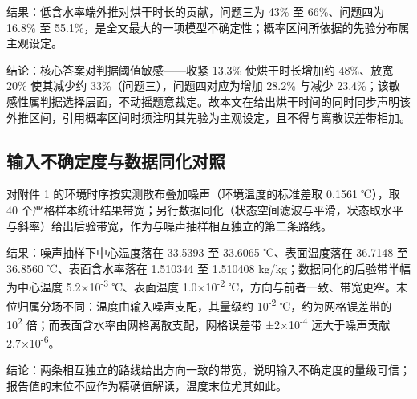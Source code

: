 结果：低含水率端外推对烘干时长的贡献，问题三为 43\% 至 66\%、问题四为 16.8\% 至 55.1\%，是全文最大的一项模型不确定性；概率区间所依据的先验分布属主观设定。

结论：核心答案对判据阈值敏感——收紧 13.3\% 使烘干时长增加约 48\%、放宽 20\% 使其减少约 33\%（问题三），问题四对应为增加 28.2\% 与减少 23.4\%；该敏感性属判据选择层面，不动摇题意裁定。故本文在给出烘干时间的同时同步声明该外推区间，引用概率区间时须注明其先验为主观设定，且不得与离散误差带相加。

\subsection{输入不确定度与数据同化对照}
对附件 1 的环境时序按实测散布叠加噪声（环境温度的标准差取 0.1561 ℃），取 40 个严格样本统计结果带宽；另行数据同化（状态空间滤波与平滑，状态取水平与斜率）给出后验带宽，作为与噪声抽样相互独立的第二条路线。

结果：噪声抽样下中心温度落在 33.5393 至 33.6065 ℃、表面温度落在 36.7148 至 36.8560 ℃、表面含水率落在 1.510344 至 1.510408 kg/kg；数据同化的后验带半幅为中心温度 5.2×10\textsuperscript{-3} ℃、表面温度 1.0×10\textsuperscript{-2} ℃，方向与前者一致、带宽更窄。末位归属分场不同：温度由输入噪声支配，其量级约 10\textsuperscript{-2} ℃，约为网格误差带的 10\textsuperscript{2} 倍；而表面含水率由网格离散支配，网格误差带 ±2×10\textsuperscript{-4} 远大于噪声贡献 2.7×10\textsuperscript{-6}。

结论：两条相互独立的路线给出方向一致的带宽，说明输入不确定度的量级可信；报告值的末位不应作为精确值解读，温度末位尤其如此。
